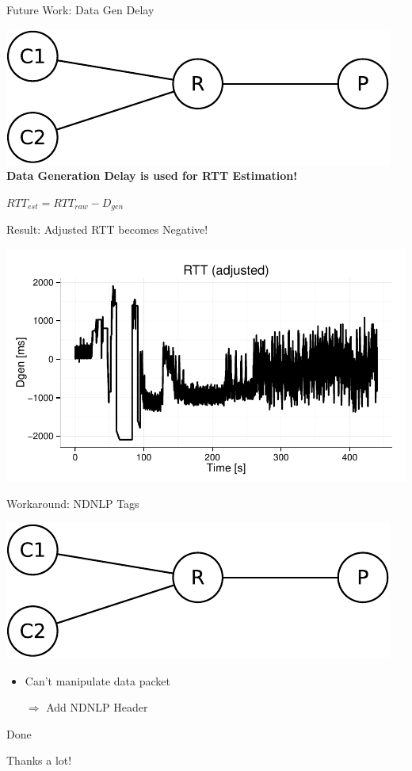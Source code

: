 \begin{frame}{Future Work: Data Gen Delay}
	
	\includegraphics[width=\linewidth,page=1]{images/fib_agg.pdf}
	~\\[1em]
	
	\large
	\textbf{Data Generation Delay is used for RTT Estimation!
	}
	~\\[1em]
	
	\Large
	
	$RTT_{est} = RTT_{raw} - D_{gen}$
\end{frame}


\begin{frame}{Result: Adjusted RTT becomes Negative!}
	
	\includegraphics[width=\linewidth,page=1]{images/test8_5.pdf}
	
\end{frame}

\begin{frame}{Workaround: NDNLP Tags}
	
	\includegraphics[width=\linewidth,page=1]{images/fib_agg.pdf}
	
	\begin{itemize}
		\item Can't manipulate data packet
		\item[$\Rightarrow$] Add NDNLP Header
	\end{itemize}
	
\end{frame}

\begin{frame}{Done}
	\LARGE
	
	Thanks a lot!
	
\end{frame}

